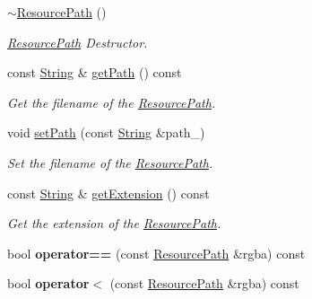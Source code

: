 \begin{DoxyCompactItemize}
\hyperlink{class_magnum_1_1_resource_path_a5f846f67f5dfbd8941227e084418afcd}{$\sim$\+Resource\+Path} ()
\begin{DoxyCompactList}\small\item\em \hyperlink{class_magnum_1_1_resource_path}{Resource\+Path} Destructor. \end{DoxyCompactList}\item 
const \hyperlink{class_magnum_1_1_string}{String} \& \hyperlink{class_magnum_1_1_resource_path_a007f883763459950a0793219b353341f}{get\+Path} () const 
\begin{DoxyCompactList}\small\item\em Get the filename of the \hyperlink{class_magnum_1_1_resource_path}{Resource\+Path}. \end{DoxyCompactList}\item 
void \hyperlink{class_magnum_1_1_resource_path_a31612405cfd5ca0301b6572d4adab86f}{set\+Path} (const \hyperlink{class_magnum_1_1_string}{String} \&path\+\_\+)
\begin{DoxyCompactList}\small\item\em Set the filename of the \hyperlink{class_magnum_1_1_resource_path}{Resource\+Path}. \end{DoxyCompactList}\item 
const \hyperlink{class_magnum_1_1_string}{String} \& \hyperlink{class_magnum_1_1_resource_path_a2521eb6a8f2bc62a07dbd7f91ec45a3c}{get\+Extension} () const 
\begin{DoxyCompactList}\small\item\em Get the extension of the \hyperlink{class_magnum_1_1_resource_path}{Resource\+Path}. \end{DoxyCompactList}\item 
bool {\bfseries operator==} (const \hyperlink{class_magnum_1_1_resource_path}{Resource\+Path} \&rgba) const \hypertarget{class_magnum_1_1_resource_path_a6216e63199c0062eebf0e8033a49451b}{}\label{class_magnum_1_1_resource_path_a6216e63199c0062eebf0e8033a49451b}

\item 
bool {\bfseries operator$<$} (const \hyperlink{class_magnum_1_1_resource_path}{Resource\+Path} \&rgba) const \hypertarget{class_magnum_1_1_resource_path_ab3bb9c17841a78cb4e499626dd7d0023}{}\label{class_magnum_1_1_resource_path_ab3bb9c17841a78cb4e499626dd7d0023}


\end{DoxyCompactItemize}
